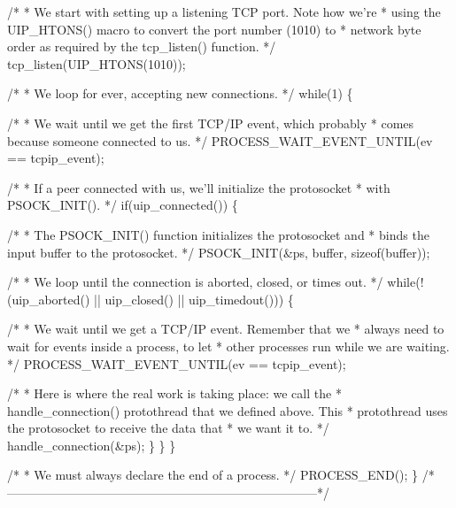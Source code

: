 \begin{DoxyCodeInclude}
  \textcolor{comment}{/*}
\textcolor{comment}{   * We start with setting up a listening TCP port. Note how we're}
\textcolor{comment}{   * using the UIP\_HTONS() macro to convert the port number (1010) to}
\textcolor{comment}{   * network byte order as required by the tcp\_listen() function.}
\textcolor{comment}{   */}
  tcp\_listen(UIP\_HTONS(1010));

  \textcolor{comment}{/*}
\textcolor{comment}{   * We loop for ever, accepting new connections.}
\textcolor{comment}{   */}
  \textcolor{keywordflow}{while}(1) \{

    \textcolor{comment}{/*}
\textcolor{comment}{     * We wait until we get the first TCP/IP event, which probably}
\textcolor{comment}{     * comes because someone connected to us.}
\textcolor{comment}{     */}
    PROCESS\_WAIT\_EVENT\_UNTIL(ev == tcpip\_event);

    \textcolor{comment}{/*}
\textcolor{comment}{     * If a peer connected with us, we'll initialize the protosocket}
\textcolor{comment}{     * with PSOCK\_INIT().}
\textcolor{comment}{     */}
    \textcolor{keywordflow}{if}(uip\_connected()) \{
      
      \textcolor{comment}{/*}
\textcolor{comment}{       * The PSOCK\_INIT() function initializes the protosocket and}
\textcolor{comment}{       * binds the input buffer to the protosocket.}
\textcolor{comment}{       */}
      PSOCK\_INIT(&ps, buffer, \textcolor{keyword}{sizeof}(buffer));

      \textcolor{comment}{/*}
\textcolor{comment}{       * We loop until the connection is aborted, closed, or times out.}
\textcolor{comment}{       */}
      \textcolor{keywordflow}{while}(!(uip\_aborted() || uip\_closed() || uip\_timedout())) \{

        \textcolor{comment}{/*}
\textcolor{comment}{         * We wait until we get a TCP/IP event. Remember that we}
\textcolor{comment}{         * always need to wait for events inside a process, to let}
\textcolor{comment}{         * other processes run while we are waiting.}
\textcolor{comment}{         */}
        PROCESS\_WAIT\_EVENT\_UNTIL(ev == tcpip\_event);

        \textcolor{comment}{/*}
\textcolor{comment}{         * Here is where the real work is taking place: we call the}
\textcolor{comment}{         * handle\_connection() protothread that we defined above. This}
\textcolor{comment}{         * protothread uses the protosocket to receive the data that}
\textcolor{comment}{         * we want it to.}
\textcolor{comment}{         */}
        handle\_connection(&ps);
      \}
    \}
  \}
  
  \textcolor{comment}{/*}
\textcolor{comment}{   * We must always declare the end of a process.}
\textcolor{comment}{   */}
  PROCESS\_END();
\}
\textcolor{comment}{/*---------------------------------------------------------------------------*/}
\end{DoxyCodeInclude}
 